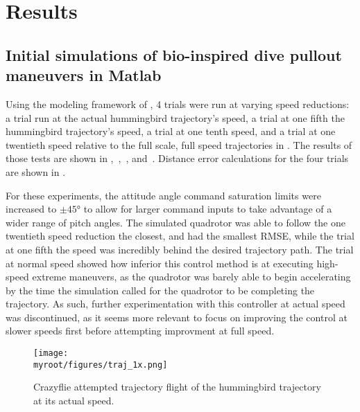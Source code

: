 \documentclass[onecolumn,10pt]{IEEEtran}
\newcommand{\myroot}{../}
\newcommand{\Matlab}{Matlab}
\begin{document}
\section{Results}
\subsection{Initial simulations of bio-inspired dive pullout maneuvers in \Matlab}
Using the modeling framework of \cite{hartman2014quadcopter}, 4 trials were run at varying speed reductions: a trial run at the actual hummingbird trajectory's speed, a trial at one fifth the hummingbird trajectory's speed, a trial at one tenth speed, and a trial at one twentieth speed relative to the full scale, full speed trajectories in \cite{clark2009courtship}. The results of those tests are shown in ,~,~, and~. Distance error calculations for the four trials are shown in . 

For these experiments, the attitude angle command saturation limits were increased to $\pm\ang{45}$ to allow for larger command inputs to take advantage of a wider range of pitch angles. The simulated quadrotor was able to follow the one twentieth speed reduction the closest, and had the smallest RMSE, while the trial at one fifth the speed was incredibly behind the desired trajectory path. The trial at normal speed showed how inferior this control method is at executing high-speed extreme maneuvers, as the quadrotor was barely able to begin accelerating by the time the simulation called for the quadrotor to be completing the trajectory. As such, further experimentation with this controller at actual speed was discontinued, as it seems more relevant to focus on improving the control at slower speeds first before attempting improvment at full speed.

\begin{figure}[p]
\begin{center}
\texttt{[image: \\myroot/figures/traj\_1x.png]}
\end{center}
\caption{Crazyflie attempted trajectory flight of the hummingbird trajectory at its actual speed.}
\label{fig:actualspeed}
\end{figure}
\end{document}
